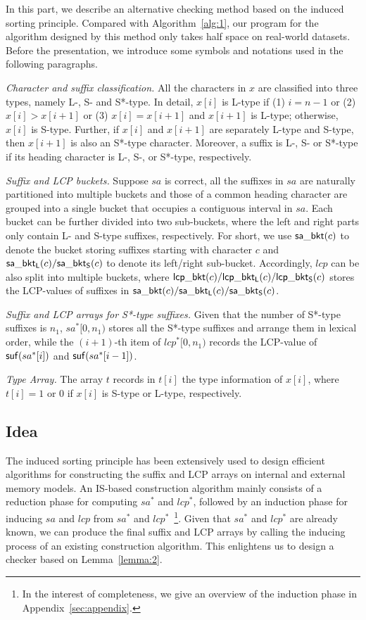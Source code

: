 \documentclass[10pt,journal,compsoc]{IEEEtran}
\begin{document}
In this part, we describe an alternative checking method based on the induced sorting principle. Compared with Algorithm~\ref{alg:1}, our program for the algorithm designed by this method only takes half space on real-world datasets. Before the presentation, we introduce some symbols and notations used in the following paragraphs.

{\em Character and suffix classification.} All the characters in $x$ are classified into three types, namely L-, S- and S*-type. In detail, $x[i]$ is L-type if (1) $i = n - 1$ or (2) $x[i] > x[i + 1]$ or (3) $x[i] = x[i + 1]$ and $x[i + 1]$ is L-type; otherwise, $x[i]$ is S-type. Further, if $x[i]$ and $x[i + 1]$ are separately L-type and S-type, then $x[i + 1]$ is also an S*-type character. Moreover, a suffix is L-, S- or S*-type if its heading character is L-, S-, or S*-type, respectively.

{\em Suffix and LCP buckets.} Suppose $sa$ is correct, all the suffixes in $sa$ are naturally partitioned into multiple buckets and those of a common heading character are grouped into a single bucket that occupies a contiguous interval in $sa$. Each bucket can be further divided into two sub-buckets, where the left and right parts only contain L- and S-type suffixes, respectively. For short, we use ${\sf sa\_bkt}(c)$ to denote the bucket storing suffixes starting with character $c$ and ${\sf sa\_bkt_L}(c)/{\sf sa\_bkt_S}(c)$ to denote its left/right sub-bucket. Accordingly, $lcp$ can be also split into multiple buckets, where ${\sf lcp\_bkt}(c)/{\sf lcp\_bkt_L}(c)/{\sf lcp\_bkt_S}(c)$ stores the LCP-values of suffixes in ${\sf sa\_bkt}(c)/{\sf sa\_bkt_L}(c)/{\sf sa\_bkt_S}(c)$.

{\em Suffix and LCP arrays for S*-type suffixes.} Given that the number of S*-type suffixes is $n_1$, $sa^*[0, n_1)$ stores all the S*-type suffixes and arrange them in lexical order, while the $(i + 1)$-th item of $lcp^*[0, n_1)$ records the LCP-value of ${\sf suf}(sa^*[i])$ and ${\sf suf}(sa^*[i - 1])$.

{\em Type Array.} The array $t$ records in $t[i]$ the type information of $x[i]$, where $t[i] = 1$ or $0$ if $x[i]$ is S-type or L-type, respectively.

\subsection{Idea} \label{sec:method2:idea}

The induced sorting principle has been extensively used to design efficient algorithms for constructing the suffix and LCP arrays on internal and external memory models. An IS-based construction algorithm mainly consists of a reduction phase for computing $sa^*$ and $lcp^*$, followed by an induction phase for inducing $sa$ and $lcp$ from $sa^*$ and $lcp^*$~\footnote{In the interest of completeness, we give an overview of the induction phase in Appendix~\ref{sec:appendix}.}. Given that $sa^*$ and $lcp^*$ are already known, we can produce the final suffix and LCP arrays by calling the inducing process of an existing construction algorithm. This enlightens us to design a checker based on Lemma~\ref{lemma:2}. 
	
\end{document}
